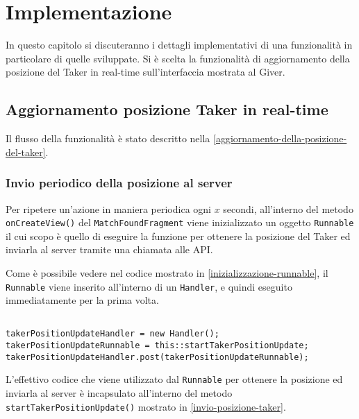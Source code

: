 \hypertarget{implementazione}{%
\chapter{Implementazione}\label{implementazione}}

In questo capitolo si discuteranno i dettagli implementativi di una funzionalità in particolare di quelle sviluppate. Si è scelta la funzionalità di aggiornamento della posizione del Taker in real-time sull'interfaccia mostrata al Giver.
\section{Aggiornamento posizione Taker in real-time}
Il flusso della funzionalità è stato descritto nella \autoref{aggiornamento-della-posizione-del-taker}.

\subsection{Invio periodico della posizione al server}\label{invio-periodico-posizione-taker}
Per ripetere un'azione in maniera periodica ogni $x$ secondi, all'interno del metodo \texttt{onCreateView()} del \texttt{MatchFoundFragment} viene inizializzato un oggetto \texttt{Runnable} il cui scopo è quello di eseguire la funzione per ottenere la posizione del Taker ed inviarla al server tramite una chiamata alle API.

Come è possibile vedere nel codice mostrato in  \autoref{inizializzazione-runnable}, il \texttt{Runnable} viene inserito all'interno di un \texttt{Handler}, e quindi eseguito immediatamente per la prima volta.

\begin{lstlisting}[caption=Inizializzazione del runnable,  label=inizializzazione-runnable]

takerPositionUpdateHandler = new Handler();
takerPositionUpdateRunnable = this::startTakerPositionUpdate;
takerPositionUpdateHandler.post(takerPositionUpdateRunnable);
\end{lstlisting}

L'effettivo codice che viene utilizzato dal \texttt{Runnable} per ottenere la posizione ed inviarla al server è incapsulato all'interno del metodo \texttt{startTakerPositionUpdate()} mostrato in \autoref{invio-posizione-taker}.

